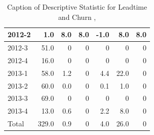 \documentclass[UKenglish]{ifimaster}  %
\begin{document}
\begin{appendices}
\begin{table}[!htbp]
\begin{adjustwidth}{-1.5cm}{}
{{\begin{tabular}{ | l | r | r | r | r | r | r | }
2012-2 & 1.0 & 8.0 & 8.0 & -1.0 & 8.0 & 8.0\\ \hline
2012-3 & 51.0 & 0 & 0 & 0 & 0 & 0\\ \hline
2012-4 & 16.0 & 0 & 0 & 0 & 0 & 0\\ \hline
2013-1 & 58.0 & 1.2 & 0 & 4.4 & 22.0 & 0\\ \hline
2013-2 & 60.0 & 0.0 & 0 & 0.1 & 1.0 & 0\\ \hline
2013-3 & 69.0 & 0 & 0 & 0 & 0 & 0\\ \hline
2013-4 & 13.0 & 0.6 & 0 & 2.2 & 8.0 & 0\\ \hline
Total & 329.0 & 0.9 & 0 & 4.0 & 26.0 & 0\\ \hline

\end{tabular}
}
}
\end{adjustwidth}
\caption[Optional caption for list of figures]{Caption of Descriptive Statistic for Leadtime and Churn  , }
\label{DS:8:3}
\end{table}


\end{appendices}
\end{document}
